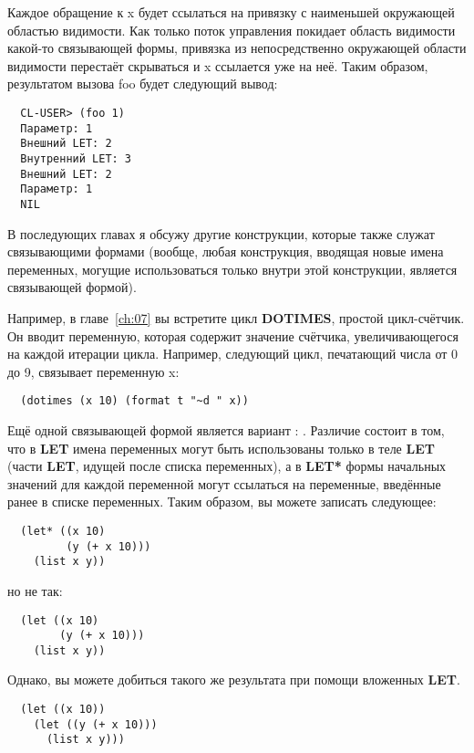 Каждое обращение к x будет ссылаться на привязку с наименьшей окружающей областью
видимости. Как только поток управления покидает область видимости какой-то связывающей
формы, привязка из непосредственно окружающей области видимости перестаёт скрываться и x
ссылается уже на неё. Таким образом, результатом вызова foo будет следующий вывод:

\begin{verbatim}
  CL-USER> (foo 1)
  Параметр: 1
  Внешний LET: 2
  Внутренний LET: 3
  Внешний LET: 2
  Параметр: 1
  NIL
\end{verbatim}

В последующих главах я обсужу другие конструкции, которые также служат связывающими
формами (вообще, любая конструкция, вводящая новые имена переменных, могущие
использоваться только внутри этой конструкции, является связывающей формой).

Например, в главе~\ref{ch:07} вы встретите цикл \textbf{DOTIMES}, простой цикл-счётчик. Он
вводит переменную, которая содержит значение счётчика, увеличивающегося на каждой итерации
цикла. Например, следующий цикл, печатающий числа от 0 до 9, связывает переменную x:

\begin{lstlisting}
  (dotimes (x 10) (format t "~d " x))
\end{lstlisting}

Ещё одной связывающей формой является вариант : \textbf{}. Различие
состоит в том, что в \textbf{LET} имена переменных могут быть использованы только в теле
\textbf{LET} (части \textbf{LET}, идущей после списка переменных), а в \textbf{LET* }формы
начальных значений для каждой переменной могут ссылаться на переменные, введённые ранее в
списке переменных. Таким образом, вы можете записать следующее:

\begin{lstlisting}
  (let* ((x 10)
         (y (+ x 10)))
    (list x y))
\end{lstlisting}

но не так:

\begin{lstlisting}
  (let ((x 10)
        (y (+ x 10)))
    (list x y))
\end{lstlisting}

Однако, вы можете добиться такого же результата при помощи вложенных \textbf{LET}.

\begin{lstlisting}
  (let ((x 10))
    (let ((y (+ x 10)))
      (list x y)))
\end{lstlisting}

